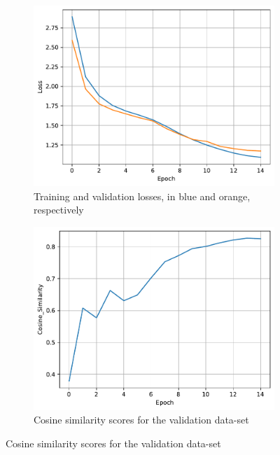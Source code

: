 \documentclass[11pt]{article}
\begin{document}
\begin{figure}[H]
    \hspace{0.025\linewidth}
    \begin{subfigure}{0.45\linewidth}
        \centering
        \includegraphics[width=\linewidth]{../data/q3/1/loss__train_val.pdf}
        \caption{Training and validation losses, in blue and orange, respectively}
    \end{subfigure}
    \hspace{0.05\linewidth}
    \begin{subfigure}{0.45\linewidth}
        \centering
        \includegraphics[width=\linewidth]{../data/q3/1/cosine_similarity__val.pdf}
        \caption{Cosine similarity scores for the validation data-set}
    \end{subfigure}


\end{figure}
\end{document}
